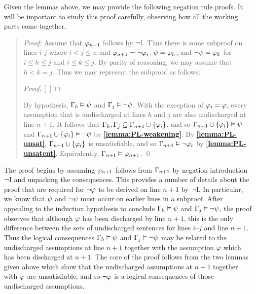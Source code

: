 Given the lemmas above, we may provide the following negation rule proofs.
It will be important to study this proof carefully, observing how all the working parts come together.



\begin{quote} 
  \textit{Proof:} Assume that $\varphi_{n+1}$ follows by $\neg$I.
  Thus there is some subproof on lines $i$-$j$ where $i<j\leq n$ and $\varphi_{n+1}=\neg\varphi_i$, $\psi=\varphi_h$, and $\neg\psi=\varphi_k$ for $i\leq h\leq j$ and $i\leq k\leq j$.
  By parity of reasoning, we may assume that $h<k=j$.
  Thus we may represent the subproof as follows:

  \begin{proof}
  \open
    \metaA {}
    \metaB
  \close
  [\ ]{\enot\metaA} %
  \end{proof}

  By hypothesis, $\Gamma_h \vDash \psi$ and $\Gamma_j \vDash \neg\psi$.
  With the exception of $\varphi_i=\varphi$, every assumption that is undischarged at lines $h$ and $j$ are also undischarged at line $n+1$.
  It follows that $\Gamma_h,\Gamma_j\subseteq\Gamma_{n+1}\cup\lbrace\varphi_i\rbrace$, and so $\Gamma_{n+1}\cup\lbrace\varphi_i\rbrace \vDash \psi$ and $\Gamma_{n+1}\cup\lbrace\varphi_i\rbrace \vDash \neg\psi$ by \textbf{\ref{lemma:PL-weakening}}.
  By \textbf{\ref{lemma:PL-unsat}}, $\Gamma_{n+1}\cup\lbrace\varphi_i\rbrace$ is unsatisfiable, and so $\Gamma_{n+1} \vDash \neg\varphi_i$ by \textbf{\ref{lemma:PL-unsatent}}.
  Equivalently, $\Gamma_{n+1} \vDash \varphi_{n+1}$.
  \qed
\end{quote}

The proof begins by assuming $\varphi_{n+1}$ follows from $\Gamma_{n+1}$ by negation introduction $\neg$I and unpacking the consequences.
This provides a number of details about the proof that are required for $\neg\varphi$ to be derived on line $n+1$ by $\neg$I.
In particular, we know that $\psi$ and $\neg \psi$ must occur on earlier lines in a subproof.
After appealing to the induction hypothesis to conclude $\Gamma_h \vDash \psi$ and $\Gamma_j \vDash \neg\psi$, the proof observes that although $\varphi$ has been discharged by line $n+1$, this is the only difference between the sets of undischarged sentences for lines $i$--$j$ and line $n+1$.
Thus the logical consequences $\Gamma_h \vDash \psi$ and $\Gamma_j \vDash \neg\psi$ may be related to the undischarged assumptions at line $n+1$ together with the assumption $\varphi$ which has been discharged at $n+1$.
The core of the proof follows from the two lemmas given above which show that the undischarged assumptions at $n+1$ together with $\varphi$ are unsatisfiable, and so $\neg\varphi$ is a logical consequences of those undischarged assumptions. 

